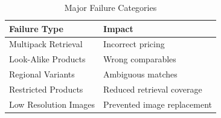 \documentclass[conference]{IEEEtran}
\begin{document}
\begin{table}[h]
\caption{Major Failure Categories}
\label{tab:failures_appendix}
\centering
\begin{tabular}{ll}
\toprule
Failure Type & Impact \\
\midrule
Multipack Retrieval & Incorrect pricing \\
Look-Alike Products & Wrong comparables \\
Regional Variants & Ambiguous matches \\
Restricted Products & Reduced retrieval coverage \\
Low Resolution Images & Prevented image replacement \\
\bottomrule
\end{tabular}
\end{table}
\end{document}
